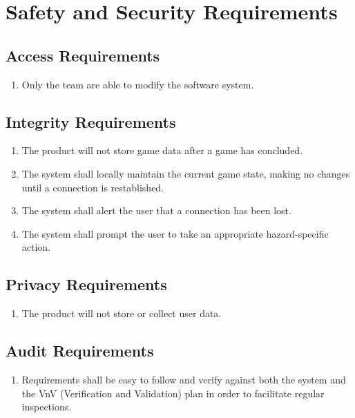 \documentclass{article}
\begin{document}
\newpage

\section{Safety and Security Requirements}

\subsection{Access Requirements}
\begin{enumerate}[{AC}1., leftmargin=2\parindent]
    \item Only the \progname{} team are able to modify the software system.
\end{enumerate}

\subsection{Integrity Requirements}
\begin{enumerate}[{IR}1., leftmargin=2\parindent]
    \item The product will not store game data after a game has concluded.
    \item The system shall locally maintain the current game state, making no changes until a connection is restablished.
    \item The system shall alert the user that a connection has been lost.
    \item The system shall prompt the user to take an appropriate hazard-specific action.
\end{enumerate}

\subsection{Privacy Requirements}
\begin{enumerate}[{PVR}1., leftmargin=2\parindent]
    \item The product will not store or collect user data.
\end{enumerate}

\subsection{Audit Requirements}
\begin{enumerate}[{AUR}1., leftmargin=2\parindent]
    \item Requirements shall be easy to follow and verify against both the system and the VnV (Verification and Validation) plan
        in order to facilitate regular inspections.
\end{enumerate}
\end{document}
